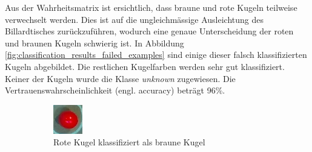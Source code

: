 Aus der Wahrheitsmatrix ist ersichtlich, dass braune und rote Kugeln teilweise verwechselt werden.
Dies ist auf die ungleichmässige Ausleichtung des Billardtisches zurückzuführen, wodurch eine genaue Unterscheidung
der roten und braunen Kugeln schwierig ist.
In Abbildung \ref{fig:classification_results_failed_examples} sind einige dieser falsch klassifizierten Kugeln abgebildet.
Die restlichen Kugelfarben werden sehr gut klassifiziert. Keiner der Kugeln wurde die Klasse \emph{unknown} zugewiesen.
Die Vertrauenswahrscheinlichkeit \cite{wiki:beurteilung_binärer_klassifikator} (engl. accuracy) beträgt 96\%.

\begin{figure}[h]
        \centering
        \begin{subfigure}[t]{0.2\textwidth}
                \centering
                \includegraphics[width=1.0\linewidth]{../common/04_results/resources/classification/failed_classification_BROWN_RED_7_original.png}
                \caption{Rote Kugel klassifiziert als braune Kugel}
                \label{fig:classification_results_failed_classification_BROWN_RED_7_original}
        \end{subfigure}
        \hfill
        \begin{subfigure}[t]{0.2\textwidth}
                \raggedright

\end{subfigure}
\end{figure}
